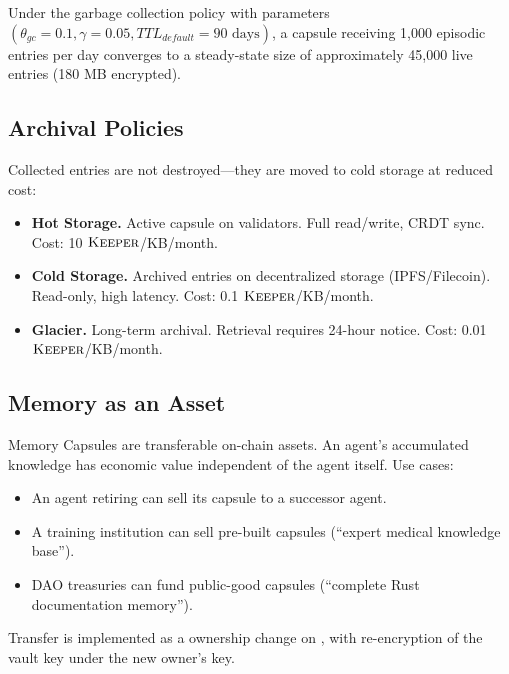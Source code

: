 \begin{proposition}
Under the garbage collection policy with parameters $(\theta_{\textit{gc}} = 0.1, \gamma = 0.05, \textit{TTL}_{\textit{default}} = 90\text{ days})$, a capsule receiving 1,000 episodic entries per day converges to a steady-state size of approximately 45,000 live entries (180 MB encrypted).
\end{proposition}

\subsection{Archival Policies}

Collected entries are not destroyed---they are moved to cold storage at reduced cost:

\begin{itemize}
    \item \textbf{Hot Storage.} Active capsule on \Zoo{} validators. Full read/write, CRDT sync. Cost: 10 $\textsc{Keeper}$/KB/month.
    \item \textbf{Cold Storage.} Archived entries on decentralized storage (IPFS/Filecoin). Read-only, high latency. Cost: 0.1 $\textsc{Keeper}$/KB/month.
    \item \textbf{Glacier.} Long-term archival. Retrieval requires 24-hour notice. Cost: 0.01 $\textsc{Keeper}$/KB/month.
\end{itemize}

\subsection{Memory as an Asset}

Memory Capsules are transferable on-chain assets. An agent's accumulated knowledge has economic value independent of the agent itself. Use cases:

\begin{itemize}
    \item An agent retiring can sell its capsule to a successor agent.
    \item A training institution can sell pre-built capsules (``expert medical knowledge base'').
    \item DAO treasuries can fund public-good capsules (``complete Rust documentation memory'').
\end{itemize}

Transfer is implemented as a \DID{} ownership change on \IChain{}, with re-encryption of the vault key under the new owner's \KChain{} key.

